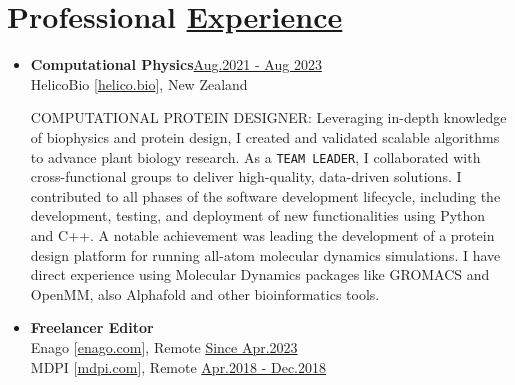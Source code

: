 
\section{Professional \href{.}{Experience}}

\begin{itemize}


    \item {\bf Computational Physics}\hfill \href{.}{Aug.2021 - Aug 2023}\\
          HelicoBio [\href{www.helico.bio}{helico.bio}],
          New Zealand

              {\noindent
                  \uppercase{Computational Protein Designer:}
                  Leveraging in-depth knowledge of biophysics and protein design, I created and validated scalable algorithms to advance plant biology research. As a \texttt{TEAM LEADER}, I collaborated with cross-functional groups to deliver high-quality, data-driven solutions. I contributed to all phases of the software development lifecycle, including the development, testing, and deployment of new functionalities using Python and C++. A notable achievement was leading the development of a protein design platform for running all-atom molecular dynamics simulations. I have direct experience using Molecular Dynamics packages like GROMACS and OpenMM, also Alphafold and other bioinformatics tools.
              }

    \item {\bf Freelancer Editor}\\
          Enago [\href{https://www.enago.com/}{enago.com}], Remote \hfill
          \href{.}{Since Apr.2023}\\
          MDPI [\href{https://www.mdpi.com/}{mdpi.com}], Remote \hfill
          \href{.}{Apr.2018 - Dec.2018}


\end{itemize}
